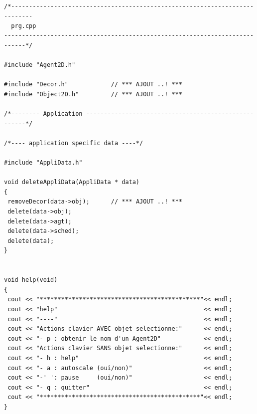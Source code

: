 \documentclass[12pt]{article}
\begin{document}
\begin{small}
\begin{verbatim}

/*----------------------------------------------------------------------------
  prg.cpp
----------------------------------------------------------------------------*/

#include "Agent2D.h"

#include "Decor.h"            // *** AJOUT ..! *** 
#include "Object2D.h"         // *** AJOUT ..! ***

/*-------- Application -----------------------------------------------------*/

/*---- application specific data ----*/

#include "AppliData.h"

void deleteAppliData(AppliData * data)
{
 removeDecor(data->obj);      // *** AJOUT ..! ***
 delete(data->obj);
 delete(data->agt);
 delete(data->sched);
 delete(data);
}


void help(void)
{
 cout << "*********************************************"<< endl;
 cout << "help"                                         << endl;
 cout << "----"                                         << endl;
 cout << "Actions clavier AVEC objet selectionne:"      << endl;
 cout << "- p : obtenir le nom d'un Agent2D"            << endl;
 cout << "Actions clavier SANS objet selectionne:"      << endl;
 cout << "- h : help"                                   << endl;
 cout << "- a : autoscale (oui/non)"                    << endl;
 cout << "-' ': pause     (oui/non)"                    << endl;
 cout << "- q : quitter"                                << endl;
 cout << "*********************************************"<< endl;
}


\end{verbatim}
\end{small}
\end{document}

